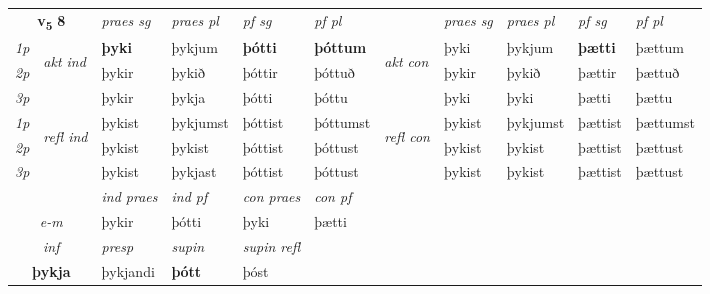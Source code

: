 \noindent
\begin{tabular}{lllllllllll} \toprule
\multicolumn{2}{c}{\textbf{v{\textsubscript{5}}} \Large{\textbf{8}}}  &  \textit{praes sg}  & \textit{praes pl}  &\textit{ pf sg} & \textit{pf pl} &  &  \textit{praes sg}  & \textit{praes pl}  & \textit{pf sg} & \textit{pf pl } \\*
	\cmidrule{3-6} \cmidrule{8-11}
 {\textit{1p}} & \multirow{3}{*}{\begin{turn}{90}\textit{akt ind}\end{turn}} & \textbf{þyki} & þykjum & \textbf{þótti} & \textbf{þóttum} & \multirow{3}{*}{\begin{turn}{90}\textit{akt con}\end{turn}} &þyki & þykjum & \textbf{þætti} & þættum\\*
 {\textit{2p}} &  &  þykir  & þykið & þóttir & þóttuð & & þykir & þykið & þættir & þættuð \\*
{\textit{3p}} &  & þykir & þykja & þótti & þóttu & & þyki & þyki& þætti & þættu \\*
\cmidrule{3-6} \cmidrule{8-11}
 {\textit{1p}} & \multirow{3}{*}{\begin{turn}{90}\textit{refl ind}\end{turn}}  & þykist & þykjumst & þóttist & þóttumst & \multirow{3}{*}{\begin{turn}{90}\textit{refl con}\end{turn}}  &þykist & þykjumst & þættist & þættumst \\*
 {\textit{2p}} &  & þykist & þykist & þóttist & þóttust & &þykist & þykist & þættist & þættust \\*
 {\textit{3p}}  & & þykist & þykjast & þóttist & þóttust & & þykist & þykist& þættist & þættust \\*
\cmidrule{3-6} \cmidrule{8-11}

   & &  \textit{ind praes} & \textit{ind pf} & \textit{con praes} & \textit{con pf} \\*
\multicolumn{2}{c}{ \textit{e-m} } & þykir & þótti & þyki & þætti \\*

\cmidrule{3-5}
   \multicolumn{2}{c}{\textit{inf}}     & \textit{presp} & \textit{supin} & \textit{supin refl}  \\*
  \multicolumn{2}{c}{\textbf{þykja}}      & þykjandi &  \textbf{þótt} & þóst  \\*
\end{tabular}

